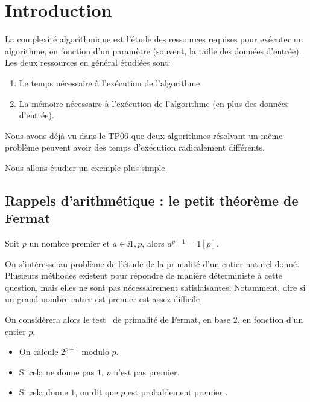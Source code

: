 \section{Introduction}

\begin{defi}[Complexité]
  La complexité algorithmique est l'étude des ressources requises pour
  exécuter un algorithme, en fonction d'un paramètre (souvent, la
  taille des données d'entrée). Les deux
  ressources en général étudiées sont:
  \begin{enumerate}
  \item Le temps nécessaire à l'exécution de l'algorithme
  \item La mémoire nécessaire à l'exécution de l'algorithme (en plus
    des données d'entrée).
  \end{enumerate}
\end{defi}


Nous avons déjà vu dans le TP06 que deux algorithmes résolvant un même problème peuvent avoir des temps d'exécution radicalement différents. 

Nous allons étudier un exemple plus simple.

\subsection{Rappels d'arithmétique : le petit théorème de Fermat}

\begin{thm}[de Fermat]
  Soit $p$ un nombre premier et $a \in \ii{1,p}$, alors $a^{p-1} = 1 [p]$.
\end{thm}

On s'intéresse au problème de l'étude de la primalité d'un entier naturel donné. 
Plusieurs méthodes existent pour répondre de manière déterministe à cette question, mais elles ne sont pas nécessairement satisfaisantes. 
Notamment, dire si un grand nombre entier est premier est assez difficile. 

On considèrera alors le \og test \fg\ de primalité de Fermat, en base 2, en fonction d'un entier $p$.
\begin{itemize}
  \item On calcule $2^{p-1}$ modulo $p$. 
  \item Si cela ne donne pas $1$, $p$ n'est pas premier. 
  \item Si cela donne $1$, on dit que \og $p$ est probablement premier \fg.
\end{itemize}

